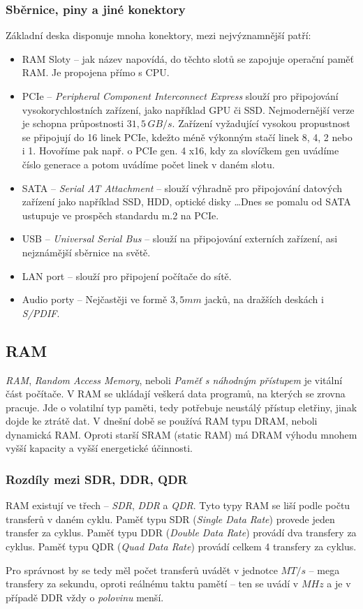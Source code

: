 \documentclass[a4paper]{article}
\begin{document}
        \subsubsection{Sběrnice, piny a jiné konektory}
            Základní deska disponuje mnoha konektory, mezi nejvýznamnější patří:
            \begin{itemize}
                \item RAM Sloty -- jak název napovídá, do těchto slotů se zapojuje operační paměť RAM. Je propojena přímo s CPU.
                \item PCIe -- \textit{Peripheral Component Interconnect Express} slouží pro připojování vysokorychlostních zařízení, jako například GPU či SSD. Nejmodernější verze je schopna průpostnosti $31,5\,GB/s$. Zařízení vyžadující vysokou propustnost se připojují do 16 linek PCIe, kdežto méně výkonným stačí linek 8, 4, 2 nebo i 1. Hovoříme pak např. o PCIe gen. 4 x16, kdy za slovíčkem gen uvádíme číslo generace a potom uvádíme počet linek v daném slotu. 
                \item SATA -- \textit{Serial AT Attachment} -- slouží výhradně pro připojování datových zařízení jako například SSD, HDD, optické disky \dots Dnes se pomalu od SATA ustupuje ve prospěch standardu m.2 na  PCIe.
                \item USB -- \textit{Universal Serial Bus} -- slouží na připojování externích zařízení, asi nejznámější sběrnice na světě.
                \item LAN port -- slouží pro připojení počítače do sítě.
                \item Audio porty -- Nejčastěji ve formě $3,5mm$ jacků, na dražších deskách i \textit{S/PDIF}.
            \end{itemize}
    \subsection{RAM}
        \textit{RAM}, \textit{Random Access Memory}, neboli \textit{Paměť s náhodným přístupem} je vitální část počítače. V RAM se ukládají veškerá data programů, na kterých se zrovna pracuje. Jde o volatilní typ paměti, tedy potřebuje neustálý přístup eletřiny, jinak dojde ke ztrátě dat. V dnešní době se používá RAM typu DRAM, neboli dynamická RAM. Oproti starší SRAM (static RAM) má DRAM výhodu mnohem vyšší kapacity a vyšší energetické účinnosti.
        \subsubsection{Rozdíly mezi SDR, DDR, QDR}
            RAM existují ve třech  -- \textit{SDR}, \textit{DDR} a \textit{QDR}. Tyto typy RAM se liší podle počtu transferů v daném cyklu. Paměť typu SDR (\textit{Single Data Rate}) provede jeden transfer za cyklus. Paměť typu DDR (\textit{Double Data Rate}) provádí dva transfery za cyklus. Paměť typu QDR (\textit{Quad Data Rate}) provádí celkem 4 transfery za cyklus. \par
            Pro správnost by se tedy měl počet transferů uvádět v jednotce $MT/s$ -- mega transfery za sekundu, oproti reálnému taktu pamětí -- ten se uvádí v $MHz$ a je v případě DDR vždy o \textit{polovinu} menší.
\end{document}
